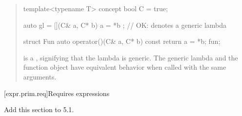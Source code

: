 \begin{quote}
\begin{addedblock}
\enterexample
\begin{codeblock}
template<typename T> concept bool C = true;

auto gl = [](C& a, C* b) { a = *b }; // OK: denotes a generic lambda

struct Fun {
  auto operator()(C& a, C* b) const { return a = *b; }
} fun;
\end{codeblock}
 is a 
,
signifying that the lambda is generic. The generic lambda 
and the function object  have equivalent behavior when 
called with the same arguments.
\exitexample
\end{addedblock}
\end{quote}

[expr.prim.req]{Requires expressions}

Add this section to 5.1.


